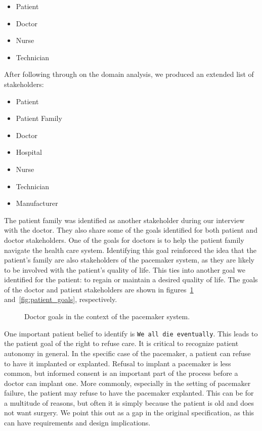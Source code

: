 \begin{itemize}
	\item Patient
	\item Doctor
	\item Nurse
	\item Technician
\end{itemize}

After following through on the domain analysis, we produced an extended list of stakeholders:

\begin{itemize}
	\item Patient
	\item Patient Family
	\item Doctor
	\item Hospital
	\item Nurse
	\item Technician
	\item Manufacturer
\end{itemize}

The patient family was identified as another stakeholder during our interview with the doctor. They also share some of the goals identified for both patient and doctor stakeholders. One of the goals for doctors is to help the patient family navigate the health care system. Identifying this goal reinforced the idea that the patient's family are also stakeholders of the pacemaker system, as they are likely to be involved with the patient's quality of life. This ties into another goal we identified for the patient: to regain or maintain a desired quality of life. The goals of the doctor and patient stakeholders are shown in figures~\ref{fig:doctor_goals} and~\ref{fig:patient_goals}, respectively.

\begin{figure}
	\centering
	
	\caption{Doctor goals in the context of the pacemaker system.}
	\label{fig:doctor_goals}
\end{figure}

One important patient belief to identify is \texttt{We all die eventually}. This leads to the patient goal of the right to refuse care. It is critical to recognize patient autonomy in general. In the specific case of the pacemaker, a patient can refuse to have it implanted or explanted. Refusal to implant a pacemaker is less common, but informed consent is an important part of the process before a doctor can implant one. More commonly, especially in the setting of pacemaker failure, the patient may refuse to have the pacemaker explanted. This can be for a multitude of reasons, but often it is simply because the patient is old and does not want surgery. We point this out as a gap in the original specification, as this can have requirements and design implications.

